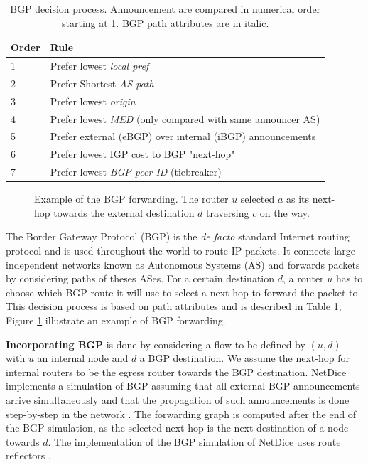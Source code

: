 \begin{table}
	\centering
	\caption{BGP decision process. Announcement are compared in numerical order starting at 1. BGP path attributes are in italic.}\label{tab:bgprocess}
		\begin{tabular}[l]{l l}
			\textbf{Order} & \textbf{Rule}\\
			\hline
			1 & Prefer lowest \textit{local pref} \\
			2 & Prefer Shortest \textit{AS path} \\
			3 & Prefer lowest \textit{origin}  \\
			4 & Prefer lowest \textit{MED} (only compared with same announcer AS) \\
			5 & Prefer external (eBGP) over internal (iBGP) announcements\\
			6 & Prefer lowest IGP cost to BGP "next-hop"\\
			7 & Prefer lowest \textit{BGP peer ID} (tiebreaker) \\
		\end{tabular}
\end{table}


\begin{figure}
	\begin{center}
		
	\end{center}
	\caption{Example of the BGP forwarding. The router $u$ selected $a$ as its next-hop towards the external destination $d$ traversing $c$ on the way.}\label{fig:bgpExampl}
\end{figure}


The Border Gateway Protocol (BGP) is the \textit{de facto} standard Internet routing protocol and is used throughout the world to route IP packets.   
It connects large independent networks known as Autonomous Systems (AS) and forwards packets by considering paths of theses ASes.    
For a certain destination $d$, a router $u$ has to choose which BGP route it will use to select a next-hop to forward the packet to.   
This decision process is based on path attributes and is described in Table \ref{tab:bgprocess}, Figure \ref{fig:bgpExampl} illustrate an example of BGP forwarding.

\textbf{Incorporating BGP} is done by considering a flow to be defined by $(u, d)$ with $u$ an internal node and $d$ a BGP destination.
We assume the next-hop for internal routers to be the egress router towards the BGP destination.
NetDice implements a simulation of BGP assuming that all external BGP announcements arrive simultaneously and that the propagation of such announcements is done step-by-step in the network \cite{BGPStepwise}. 
The forwarding graph is computed after the end of the BGP simulation, as the selected next-hop is the next destination of a node towards $d$.
The implementation of the BGP simulation of NetDice uses route reflectors \cite{rfc4456}.

